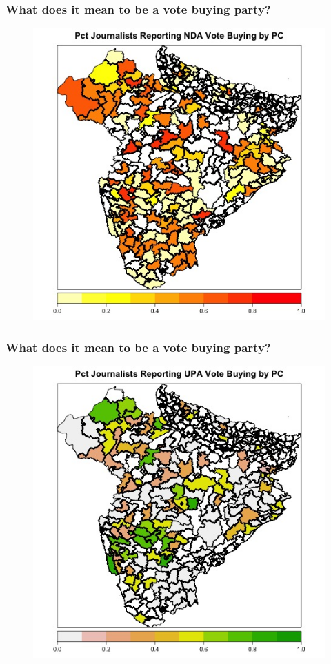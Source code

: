 \documentclass{beamer}
\begin{document}
\begin{frame}
\frametitle{What does it mean to be a vote buying party?}

\begin{figure}
\centering
\includegraphics[width=.6\textwidth]{../Figures/nda_vb_map}
\end{figure}

\end{frame}



\begin{frame}
\frametitle{What does it mean to be a vote buying party?}

\begin{figure}
\centering
\includegraphics[width=.6\textwidth]{../Figures/upa_vb_map}
\end{figure}

\end{frame}
\end{document}
